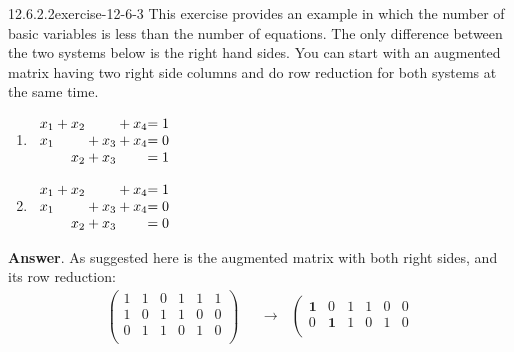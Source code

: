 \documentclass[twoside,10pt,]{book}
\numberwithin{equation}{section}
\begin{document}
\begin{divisionsolution}{12.6.2.2}{}{exercise-12-6-3}%
\hypertarget{p-4740}{}%
This exercise provides an example in which the number of basic variables is less than the number of equations. The only difference between the two systems below is the right hand sides.  You can start with an augmented matrix having two right side columns and do row reduction for both systems at the same time.\leavevmode%
\begin{multicols}{2}
\begin{enumerate}[label=(\alph*)]
\item\hypertarget{li-2159}{}\hypertarget{p-4741}{}%
\(\begin{array}{r@{}r@{}r@{}r@{}r@{}r@{}r@{}r@{}}
x_1 & {}+{} &x_2 &       &    &{}+{} & x_4   &= 1 \\
x_1 &       &    & {}+{} &x_3 & {}+{} & x_4  &= 0 \\
&       & x_2 & {}+{} &x_3 &      &      &= 1 \\
\end{array}\)%
\item\hypertarget{li-2160}{}\hypertarget{p-4742}{}%
\(\begin{array}{r@{}r@{}r@{}r@{}r@{}r@{}r@{}r@{}}
x_1 & {}+{} &x_2 &       &    &{}+{} & x_4   &= 1 \\
x_1 &       &    & {}+{} &x_3 & {}+{} & x_4  &= 0 \\
&       & x_2 & {}+{} &x_3 &      &      &= 0 \\
\end{array}\)%
\end{enumerate}
\end{multicols}
%
\par\smallskip%
\noindent\textbf{Answer}.\quad%
\hypertarget{p-4743}{}%
As suggested here is the augmented matrix with both right sides, and its row reduction:%
\begin{equation*}
\begin{split}
\left(
\begin{array}{cccc|cc}
1 & 1 & 0 &  1 & 1 & 1 \\
1 & 0 & 1 &  1 & 0 & 0  \\
0 & 1 & 1 &  0 & 1 & 0  \\
\end{array}
\right) & \text{  }\longrightarrow \text{   }
\left(
\begin{array}{cccc|cc}
\textbf{1} & 0  & 1 &  1 & 0 & 0 \\
0 & \textbf{1}  & 1 &  0 & 1 & 0  \\

\end{array}
\end{split}
\end{equation*}
\end{divisionsolution}
\end{document}
